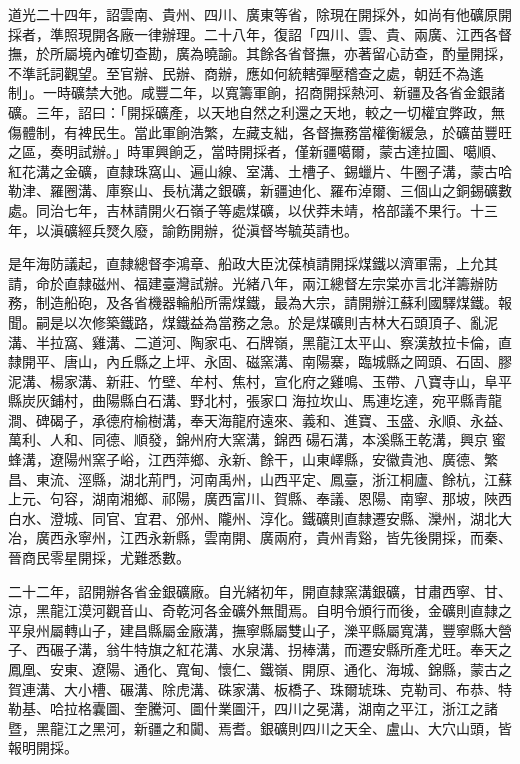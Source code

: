 \begin{pinyinscope}
道光二十四年，詔雲南、貴州、四川、廣東等省，除現在開採外，如尚有他礦原開採者，準照現開各廠一律辦理。二十八年，復詔「四川、雲、貴、兩廣、江西各督撫，於所屬境內確切查勘，廣為曉諭。其餘各省督撫，亦著留心訪查，酌量開採，不準託詞觀望。至官辦、民辦、商辦，應如何統轄彈壓稽查之處，朝廷不為遙制」。一時礦禁大弛。咸豐二年，以寬籌軍餉，招商開採熱河、新疆及各省金銀諸礦。三年，詔曰：「開採礦產，以天地自然之利還之天地，較之一切權宜弊政，無傷體制，有裨民生。當此軍餉浩繁，左藏支絀，各督撫務當權衡緩急，於礦苗豐旺之區，奏明試辦。」時軍興餉乏，當時開採者，僅新疆噶爾，蒙古達拉圖、噶順、紅花溝之金礦，直隸珠窩山、遍山線、室溝、土槽子、錫蠟片、牛圈子溝，蒙古哈勒津、羅圈溝、庫察山、長杭溝之銀礦，新疆迪化、羅布淖爾、三個山之銅錫礦數處。同治七年，吉林請開火石嶺子等處煤礦，以伏莽未靖，格部議不果行。十三年，以滇礦經兵燹久廢，諭飭開辦，從滇督岑毓英請也。

是年海防議起，直隸總督李鴻章、船政大臣沈葆楨請開採煤鐵以濟軍需，上允其請，命於直隸磁州、福建臺灣試辦。光緒八年，兩江總督左宗棠亦言北洋籌辦防務，制造船砲，及各省機器輪船所需煤鐵，最為大宗，請開辦江蘇利國驛煤鐵。報聞。嗣是以次修築鐵路，煤鐵益為當務之急。於是煤礦則吉林大石頭頂子、亂泥溝、半拉窩、雞溝、二道河、陶家屯、石牌嶺，黑龍江太平山、察漢敖拉卡倫，直隸開平、唐山，內丘縣之上坪、永固、磁窯溝、南陽寨，臨城縣之岡頭、石固、膠泥溝、楊家溝、新莊、竹壁、牟村、焦村，宣化府之雞鳴、玉帶、八寶寺山，阜平縣炭灰鋪村，曲陽縣白石溝、野北村，張家口海拉坎山、馬連圪達，宛平縣青龍澗、碑碣子，承德府榆樹溝，奉天海龍府遠來、義和、進寶、玉盛、永順、永益、萬利、人和、同德、順發，錦州府大窯溝，錦西碭石溝，本溪縣王乾溝，興京蜜蜂溝，遼陽州窯子峪，江西萍鄉、永新、餘干，山東嶧縣，安徽貴池、廣德、繁昌、東流、涇縣，湖北荊門，河南禹州，山西平定、鳳臺，浙江桐廬、餘杭，江蘇上元、句容，湖南湘鄉、祁陽，廣西富川、賀縣、奉議、恩陽、南寧、那坡，陜西白水、澄城、同官、宜君、邠州、隴州、淳化。鐵礦則直隸遷安縣、灤州，湖北大冶，廣西永寧州，江西永新縣，雲南開、廣兩府，貴州青谿，皆先後開採，而秦、晉商民零星開採，尤難悉數。

二十二年，詔開辦各省金銀礦廠。自光緒初年，開直隸窯溝銀礦，甘肅西寧、甘、涼，黑龍江漠河觀音山、奇乾河各金礦外無聞焉。自明令頒行而後，金礦則直隸之平泉州屬轉山子，建昌縣屬金廠溝，撫寧縣屬雙山子，濼平縣屬寬溝，豐寧縣大營子、西碾子溝，翁牛特旗之紅花溝、水泉溝、拐棒溝，而遷安縣所產尤旺。奉天之鳳凰、安東、遼陽、通化、寬甸、懷仁、鐵嶺、開原、通化、海城、錦縣，蒙古之賀連溝、大小槽、碾溝、除虎溝、硃家溝、板橋子、珠爾琥珠、克勒司、布恭、特勒基、哈拉格囊圖、奎騰河、圖什業圖汗，四川之冕溝，湖南之平江，浙江之諸暨，黑龍江之黑河，新疆之和闐、焉耆。銀礦則四川之天全、盧山、大穴山頭，皆報明開採。


\end{pinyinscope}

